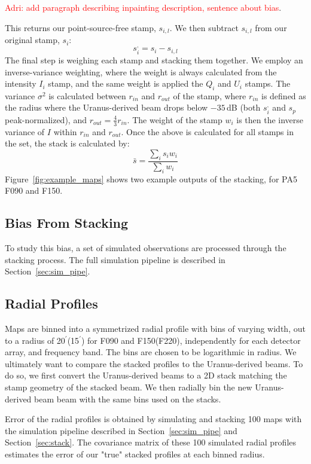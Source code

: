  \textcolor{red}{Adri: add paragraph describing inpainting description, sentence about bias}. 
 
 This returns our point-source-free stamp, $s_{i,l}$.  We then subtract $s_{i,l}$ from our original stamp, $s_i$:
\begin{equation}
    s_i^{,} = s_i - s_{i,l}
\end{equation}
The final step is weighing each stamp and stacking them together.  We employ an inverse-variance weighting, where the weight is always calculated from the intensity $I_i$ stamp, and the same weight is applied the $Q_i$ and $U_i$ stamps.  The variance $\sigma^2$ is calculated between $r_{in}$ and $r_{out}$ of the stamp, where $r_{in}$ is defined as the radius where the Uranus-derived beam drops below $-35$\,dB (both $s_i^{,}$ and $s_p$ peak-normalized), and $r_{out}=\frac{4}{3}r_{in}$.  The weight of the stamp $w_i$ is then the inverse variance of $I$ within $r_{in}$ and $r_{out}$.  Once the above is calculated for all stamps in the set, the stack is calculated by:
\begin{equation}
    \bar{s} = \frac{\sum_i s_i w_i }{\sum_i w_i}
\end{equation}
Figure~\ref{fig:example_maps} shows two example outputs of the stacking, for PA5 F090 and F150.  

\subsection{Bias From Stacking}
\label{subsec:bias}
To study this bias, a set of simulated observations are processed through the stacking process.  The full simulation pipeline is described in Section~\ref{sec:sim_pipe}.

\subsection{Radial Profiles}
\label{subsec:profs}
Maps are binned into a symmetrized radial profile with bins of varying width, out to a radius of 20$^{\prime}$(15$^{\prime}$) for F090 and F150(F220), independently for each detector array, and frequency band.  The bins are chosen to be logarithmic in radius.  We ultimately want to compare the stacked profiles to the Uranus-derived beams.  To do so, we first convert the Uranus-derived beams to a 2D stack matching the stamp geometry of the stacked beam.  We then radially bin the new Uranus-derived beam beam with the same bins used on the stacks.

Error of the radial profiles is obtained by simulating and stacking 100 maps with the simulation pipeline described in Section~\ref{sec:sim_pipe} and Section~\ref{sec:stack}.  The covariance matrix of these 100 simulated radial profiles estimates the error of our "true" stacked profiles at each binned radius.

